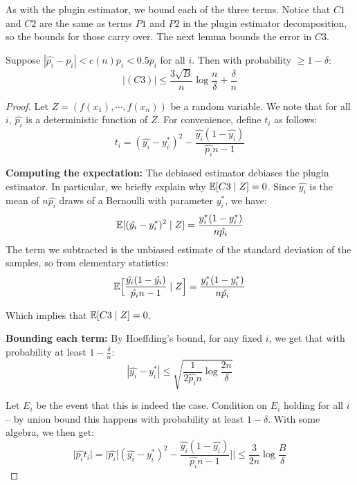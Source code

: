 As with the plugin estimator, we bound each of the three terms. Notice that $C1$ and $C2$ are the same as terms $P1$ and $P2$ in the plugin estimator decomposition, so the bounds for those carry over. The next lemma bounds the error in $C3$.

\begin{lemma}[C3]
\label{lem:c3_bound}
Suppose $|\hat{p_i} - p_i| < c(n) p_i < 0.5 p_i$ for all $i$. Then with probability $\geq 1 - \delta$:
\[ |(C3)| \leq \frac{3\sqrt{B}}{n} \log{\frac{n}{\delta}} + \frac{\delta}{n} \]
\end{lemma}

\begin{proof}
Let $Z = (f(x_1), \cdots, f(x_n))$ be a random variable. We note that for all $i$, $\hat{p_i}$ is a deterministic function of $Z$. For convenience, define $t_i$ as follows:
\[ t_i = (\hat{y_i} - y_i^*)^2 - \frac{\hat{y_i}(1 - \hat{y_i})}{\hat{p_i}n-1} \]

\textbf{Computing the expectation:} The debiased estimator debiases the plugin estimator. In particular, we briefly explain why $\mathbb{E}[C3 \mid Z] = 0$. Since $\hat{y_i}$ is the mean of $n\hat{p_i}$ draws of a Bernoulli with parameter $y_i^*$, we have:
\[ \mathbb{E}[(\hat{y_i} - y_i^*)^2 \mid Z] = \frac{y_i^*(1 - y_i^*)}{n\hat{p_i}} \] 
The term we subtracted is the unbiased estimate of the standard deviation of the samples, so from elementary statistics:
\[ \mathbb{E}\Big[\frac{\hat{y_i}(1 - \hat{y_i})}{\hat{p_i}n-1} \mid Z\Big] = \frac{y_i^*(1 - y_i^*)}{n\hat{p_i}} \]

Which implies that $\mathbb{E}[C3 \mid Z] = 0$.

\textbf{Bounding each term:} By Hoeffding's bound, for any fixed $i$, we get that with probability at least $1 - \frac{\delta}{n}$: 
\[ |\hat{y_i} - y_i^*| \leq \sqrt{\frac{1}{2\hat{p_i}n} \log{\frac{2n}{\delta}}} \]

Let $E_i$ be the event that this is indeed the case. Condition on $E_i$ holding for all $i$ -- by union bound this happens with probability at least $1 - \delta$.
With some algebra, we then get:
\[ \lvert \hat{p_i}t_i \rvert = \Big\lvert \hat{p_i}\Big[ (\hat{y_i} - y_i^*)^2 - \frac{\hat{y_i}(1 - \hat{y_i})}{\hat{p_i}n-1} \Big] \Big\rvert \leq \frac{3}{2n} \log{\frac{B}{\delta}} \]


\end{proof}
